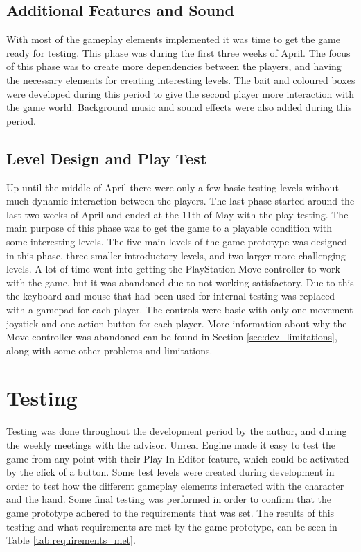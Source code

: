 \subsection{Additional Features and Sound}
With most of the gameplay elements implemented it was time to get the game ready for testing. This phase was during the first three weeks of April. The focus of this phase was to create more dependencies between the players, and having the necessary elements for creating interesting levels. The bait and coloured boxes were developed during this period to give the second player more interaction with the game world. Background music and sound effects were also added during this period.

\subsection{Level Design and Play Test}
Up until the middle of April there were only a few basic testing levels without much dynamic interaction between the players. The last phase started around the last two weeks of April and ended at the 11th of May with the play testing. The main purpose of this phase was to get the game to a playable condition with some interesting levels. The five main levels of the game prototype was designed in this phase, three smaller introductory levels, and two larger more challenging levels. A lot of time went into getting the PlayStation Move controller to work with the game, but it was abandoned due to not working satisfactory. Due to this the keyboard and mouse that had been used for internal testing was replaced with a gamepad for each player. The controls were basic with only one movement joystick and one action button for each player. More information about why the Move controller was abandoned can be found in Section \ref{sec:dev_limitations}, along with some other problems and limitations.

\section{Testing}
Testing was done throughout the development period by the author, and during the weekly meetings with the advisor. Unreal Engine made it easy to test the game from any point with their Play In Editor feature, which could be activated by the click of a button. Some test levels were created during development in order to test how the different gameplay elements interacted with the character and the hand. Some final testing was performed in order to confirm that the game prototype adhered to the requirements that was set. The results of this testing and what requirements are met by the game prototype, can be seen in Table \ref{tab:requirements_met}. 

